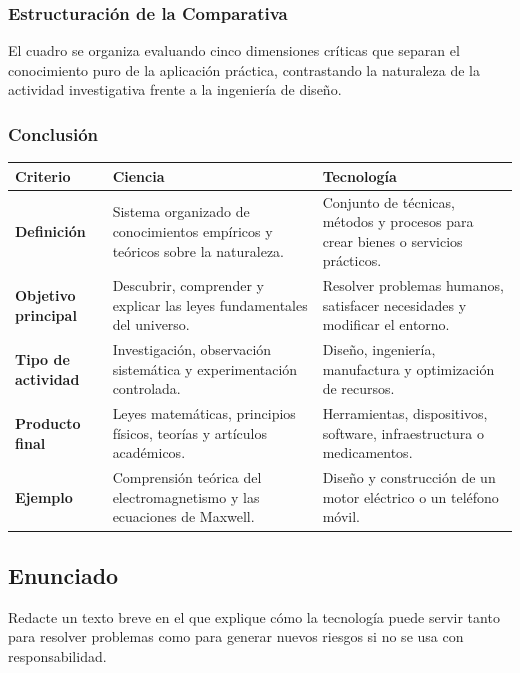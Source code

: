 \documentclass[12pt, a4paper]{article}
\begin{document}
\subsubsection*{Estructuración de la Comparativa}
El cuadro se organiza evaluando cinco dimensiones críticas que separan el conocimiento puro de la aplicación práctica, contrastando la naturaleza de la actividad investigativa frente a la ingeniería de diseño.

\subsubsection*{Conclusión}
\begin{center}
\renewcommand{\arraystretch}{1.5}
\begin{tabular}{|p{3cm}|p{6cm}|p{6cm}|}
\hline
\textbf{Criterio} & \textbf{Ciencia} & \textbf{Tecnología} \\
\hline
\textbf{Definición} & Sistema organizado de conocimientos empíricos y teóricos sobre la naturaleza. & Conjunto de técnicas, métodos y procesos para crear bienes o servicios prácticos. \\
\hline
\textbf{Objetivo principal} & Descubrir, comprender y explicar las leyes fundamentales del universo. & Resolver problemas humanos, satisfacer necesidades y modificar el entorno. \\
\hline
\textbf{Tipo de actividad} & Investigación, observación sistemática y experimentación controlada. & Diseño, ingeniería, manufactura y optimización de recursos. \\
\hline
\textbf{Producto final} & Leyes matemáticas, principios físicos, teorías y artículos académicos. & Herramientas, dispositivos, software, infraestructura o medicamentos. \\
\hline
\textbf{Ejemplo} & Comprensión teórica del electromagnetismo y las ecuaciones de Maxwell. & Diseño y construcción de un motor eléctrico o un teléfono móvil. \\
\hline
\end{tabular}
\end{center}

\newpage

\subsection*{Enunciado}
Redacte un texto breve en el que explique cómo la tecnología puede servir tanto para resolver problemas como para generar nuevos riesgos si no se usa con responsabilidad.
\end{document}
